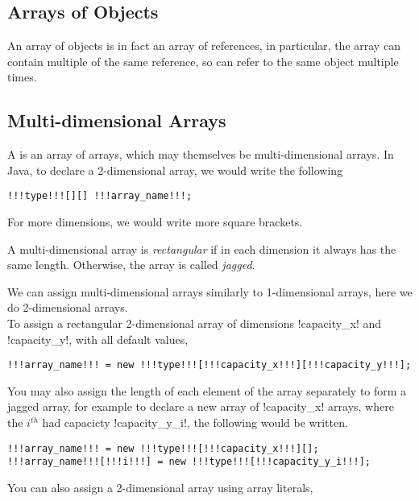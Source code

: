 \documentclass[11pt]{article}
\begin{document}
\subsection{Arrays of Objects}
An array of objects is in fact an array of references, in particular, the array can contain multiple of the same reference, so can refer to the same object multiple times.
\subsection{Multi-dimensional Arrays}
A  is an array of arrays, which may themselves be multi-dimensional arrays. In Java, to declare a 2-dimensional array, we would write the following
\vspace{-20pt}
\begin{lstlisting}[style=javaSyntax]
!!!type!!![][] !!!array_name!!!; 
\end{lstlisting}
For more dimensions, we would write more square brackets.
\begin{defi}
A multi-dimensional array is \emph{rectangular} if in each dimension it always has the same length. Otherwise, the array is called \emph{jagged}.
\end{defi}
\noindent We can assign multi-dimensional arrays similarly to 1-dimensional arrays, here we do 2-dimensional arrays.
\vspace{5pt} \\ To assign a rectangular 2-dimensional array of dimensions \inlineJava!capacity_x! and \inlineJava!capacity_y!, with all default values,
\vspace{-22pt}
\begin{lstlisting}[style=javaSyntax]
!!!array_name!!! = new !!!type!!![!!!capacity_x!!!][!!!capacity_y!!!]; 
\end{lstlisting}
You may also assign the length of each element of the array separately to form a jagged array, for example to declare a new array of \inlineJava!capacity_x! arrays, where the $i^{th}$ had capacicty \inlineJava!capacity_y_i!, the following would be written.
\vspace{-20pt}
\begin{lstlisting}[style=javaSyntax]
!!!array_name!!! = new !!!type!!![!!!capacity_x!!!][];
!!!array_name!!![!!!i!!!] = new !!!type!!![!!!capacity_y_i!!!];
\end{lstlisting}
You can also assign a 2-dimensional array using array literals,
\vspace{-20pt}
\end{document}
